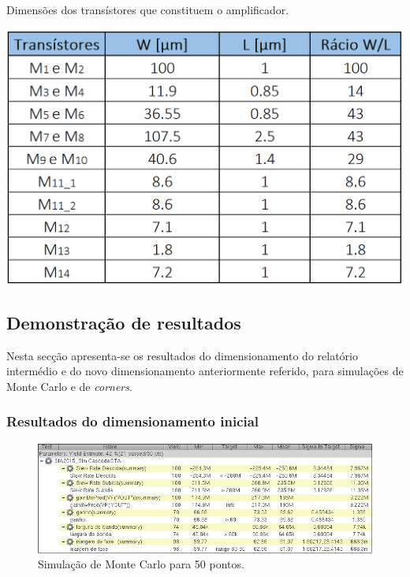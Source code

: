 \documentclass[11pt]{article}
\numberwithin{equation}{section}
\begin{document}
\begin{table}[H]
	\centering
	\caption{Dimensões dos transístores que constituem o amplificador.}
	\vspace{-1.5mm}
	\includegraphics[keepaspectratio=true, scale=0.35]{teoricas/dimensoes1}
\end{table}

\subsection{Demonstração de resultados} 

Nesta secção apresenta-se os resultados do dimensionamento do relatório intermédio e do novo dimensionamento anteriormente referido, para simulações de Monte Carlo e de \textit{corners}.

\subsubsection{Resultados do dimensionamento inicial} 

\begin{figure}[H]
	\centering
	\includegraphics[keepaspectratio=true, scale=0.65]{exps/MonteCarlo_50pt_Antigo}
	\vspace{-0.5em}
	\caption{Simulação de Monte Carlo para 50 pontos.}
	\vspace{-0.8em}
\end{figure} 
\end{document}
